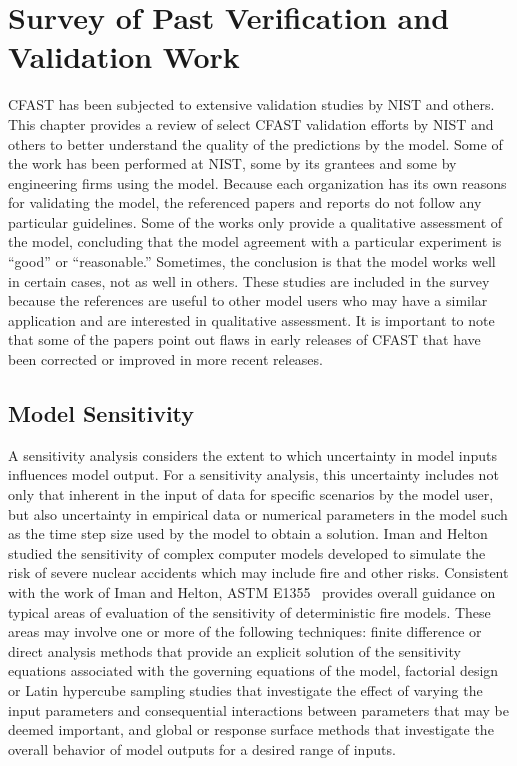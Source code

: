 \chapter{Survey of Past Verification and Validation Work}

\label{Survey_Chapter}

CFAST has been subjected to extensive validation studies by NIST and others. This chapter provides a review of select CFAST validation efforts by NIST and others to better understand the quality of the predictions by the model. Some of the work has been  performed at NIST, some by its grantees and some by engineering firms using the model.  Because each organization has its  own reasons for  validating the model, the  referenced papers and reports do not follow any particular guidelines. Some of the works only provide  a qualitative assessment  of the model,  concluding that the  model  agreement with  a  particular  experiment  is ``good''  or ``reasonable.'' Sometimes, the conclusion is that the model works well in certain cases, not as well in others. These studies are included in the survey because the references  are useful to other model users who may have a similar application  and are interested in qualitative assessment. It is important to note  that some of the papers point out flaws in early releases of CFAST that have been corrected or improved in more recent  releases.

\section{Model Sensitivity}

A sensitivity analysis considers the extent to which uncertainty in model inputs influences model output.  For a sensitivity analysis, this uncertainty includes not only that inherent in the input of data for specific scenarios by the model user, but also uncertainty in empirical data or numerical parameters in the model such as the time step size used by the model to obtain a solution. Iman and Helton~\cite{Iman:1988} studied the sensitivity of complex computer models developed to simulate the risk of severe nuclear accidents which may include fire and other risks. Consistent with the work of Iman and Helton, ASTM E1355~\cite{ASTM:E1355} provides overall guidance on typical areas of evaluation of the sensitivity of deterministic fire models.  These areas may involve one or more of the following techniques: finite difference or direct analysis methods that provide an explicit solution of the sensitivity equations associated with the governing equations of the model, factorial design or Latin hypercube sampling studies that investigate the effect of varying the input parameters and consequential interactions between parameters that may be deemed important, and global or response surface methods that investigate the overall behavior of model outputs for a desired range of inputs.

